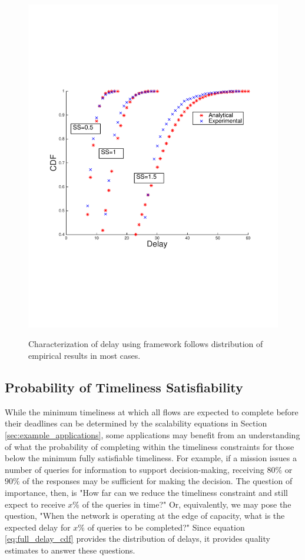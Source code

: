 \begin{figure}[]
{        \includegraphics[scale=0.40, clip=true, trim=12mm 65mm 20mm 65mm]{figures/delay_cdfs/delay_cdf_grid_half.pdf}
        \label{fig:scal_vs_qoi_grid}
        }
   \caption{Characterization of delay using framework follows distribution of empirical results in most cases.}
   \label{fig:delay_cdf_anal_vs_sim}
\end{figure}

\subsection{Probability of Timeliness Satisfiability}

While the minimum timeliness at which all flows are expected to complete before their deadlines can be determined by the scalability equations in Section \ref{sec:example_applications}, some applications may benefit from an understanding of what the probability of completing within the timeliness constraints for those below the minimum fully satisfiable timeliness.  For example, if a mission issues a number of queries for information to support decision-making, receiving $80\%$ or $90\%$ of the responses may be sufficient for making the decision.  The question of importance, then, is "How far can we reduce the timeliness constraint and still expect to receive $x\%$ of the queries in time?"  Or, equivalently, we may pose the question, "When the network is operating at the edge of capacity, what is the expected delay for $x\%$ of queries to be completed?"  Since equation \ref{eq:full_delay_cdf} provides the distribution of delays, it provides quality estimates to answer these questions.  

